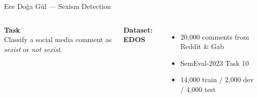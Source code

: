 \documentclass[aspectratio=169]{beamer}
\begin{document}

\begin{frame}{Ece Doğa Gül — Sexism Detection}

\begin{columns}[t]


\textbf{Task}\\[0.2cm]

Classify a social media comment as \textit{sexist} or \textit{not sexist}.


\textbf{Dataset: EDOS}\\[0.2cm]

\begin{itemize}

    \item 20,000 comments from Reddit \& Gab

    \item SemEval-2023 Task 10

    \item 14,000 train / 2,000 dev / 4,000 test

\end{itemize}

\end{columns}

\end{frame}
\end{document}
